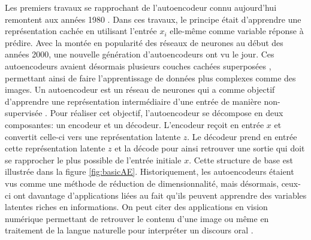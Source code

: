 Les premiers travaux se rapprochant de l'autoencodeur connu aujourd'hui remontent aux années 1980 \citep{Rumelhart-1986}. Dans ces travaux, le principe était d'apprendre une représentation cachée en utilisant l'entrée $x_i$ elle-même comme variable réponse à prédire. Avec la montée en popularité des réseaux de neurones au début des années 2000, une nouvelle génération d'autoencodeurs ont vu le jour. Ces autoencodeurs avaient désormais plusieurs couches cachées superposées \citep{HintonSalakhutdinov2006b}, permettant ainsi de faire l'apprentissage de données plus complexes comme des images. Un autoencodeur est un réseau de neurones qui a comme objectif d'apprendre une représentation intermédiaire d'une entrée de manière non-supervisée \citep{Goodfellow-et-al-2016}. Pour réaliser cet objectif, l'autoencodeur se décompose en deux composantes: un encodeur et un décodeur. L'encodeur reçoit en entrée $x$ et convertit celle-ci vers une représentation latente $z$. Le décodeur prend en entrée cette représentation latente $z$ et la décode pour ainsi retrouver une sortie qui doit se rapprocher le plus possible de l'entrée initiale $x$. Cette structure de base est illustrée dans la figure \ref{fig:basicAE}. Historiquement, les autoencodeurs étaient vus comme une méthode de réduction de dimensionnalité, mais désormais, ceux-ci ont davantage d'applications liées au fait qu'ils peuvent apprendre des variables latentes riches en informations. On peut citer des applications en vision numérique permettant de retrouver le contenu d'une image \citep{conf/esann/KrizhevskyH11} ou même en traitement de la langue naturelle pour interpréter un discours oral \citep{inproceedings}. \newline

